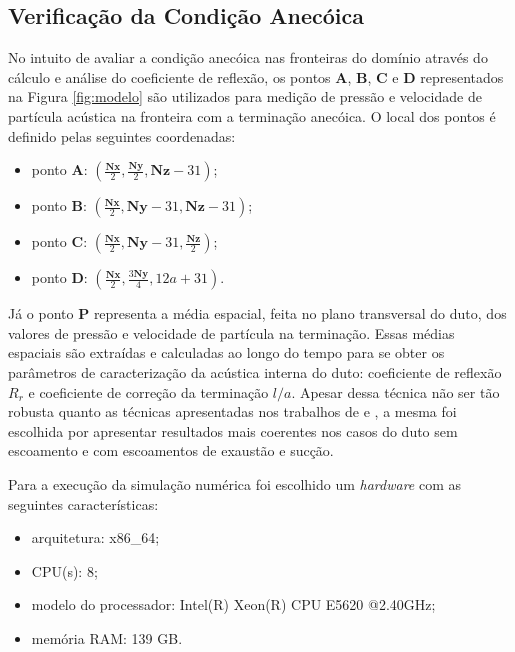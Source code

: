 \subsection{Verificação da Condição Anecóica}

No intuito de avaliar a condição anecóica nas fronteiras do domínio através do cálculo e análise do coeficiente de reflexão, os pontos $\textbf{A}$, $\textbf{B}$, $\textbf{C}$ e $\textbf{D}$ representados na Figura \ref{fig:modelo} são utilizados para medição de pressão e velocidade de partícula acústica na fronteira com a terminação anecóica. O local dos pontos é definido pelas seguintes coordenadas:

\begin{itemize}
  \item ponto $\textbf{A}$: $(\frac{\textbf{Nx}}{2}, \frac{\textbf{Ny}}{2}, \textbf{Nz} - 31)$;
  \item ponto $\textbf{B}$: $(\frac{\textbf{Nx}}{2}, \textbf{Ny} - 31, \textbf{Nz} - 31)$;
  \item ponto $\textbf{C}$: $(\frac{\textbf{Nx}}{2}, \textbf{Ny} - 31, \frac{\textbf{Nz}}{2})$;
   \item ponto $\textbf{D}$: $(\frac{\textbf{Nx}}{2}, \frac{3\textbf{Ny}}{4}, 12a + 31)$.
\end{itemize}
 
Já o ponto $\textbf{P}$ representa a média espacial, feita no plano transversal do duto, dos valores de pressão e velocidade de partícula na terminação. Essas médias espaciais são extraídas e calculadas ao longo do tempo para se obter os parâmetros de caracterização da acústica interna do duto: coeficiente de reflexão $R_{r}$ e coeficiente de correção da terminação $l/a$. Apesar dessa técnica não ser tão robusta quanto as técnicas apresentadas nos trabalhos de  e , a mesma foi escolhida por apresentar resultados mais coerentes nos casos do duto sem escoamento e com escoamentos de exaustão e sucção. 

Para a execução da simulação numérica foi escolhido um \textit{hardware} com as seguintes características:

\begin{itemize}
  \item arquitetura: x86\_64;
  \item CPU(s): 8;
  \item modelo do processador: Intel(R) Xeon(R) CPU E5620 @2.40GHz;
  \item memória RAM: 139 GB.
\end{itemize}

